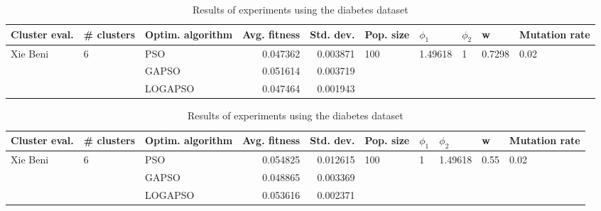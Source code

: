 \documentclass{article}
\begin{document}
\begin{table}
\centering
\caption{Results of experiments using the diabetes dataset}
\begin{tabular}{lllrrlllll}
\toprule
            Cluster eval. &        \# clusters & Optim. algorithm &  Avg. fitness &  Std. dev. &            Pop. size &               $\phi_{1}$ &         $\phi_{2}$ &                       w &         Mutation rate \\
\midrule
\multirow{3}{*}{Xie Beni} & \multirow{3}{*}{6} &              PSO &      0.047362 &   0.003871 & \multirow{3}{*}{100} & \multirow{3}{*}{1.49618} & \multirow{3}{*}{1} & \multirow{3}{*}{0.7298} & \multirow{3}{*}{0.02} \\
                          &                    &            GAPSO &      0.051614 &   0.003719 &                      &                          &                    &                         &                       \\
                          &                    &          LOGAPSO &      0.047464 &   0.001943 &                      &                          &                    &                         &                       \\
\bottomrule
\end{tabular}
\end{table}
\begin{table}
\centering
\caption{Results of experiments using the diabetes dataset}
\begin{tabular}{lllrrlllll}
\toprule
            Cluster eval. &        \# clusters & Optim. algorithm &  Avg. fitness &  Std. dev. &            Pop. size &         $\phi_{1}$ &               $\phi_{2}$ &                     w &         Mutation rate \\
\midrule
\multirow{3}{*}{Xie Beni} & \multirow{3}{*}{6} &              PSO &      0.054825 &   0.012615 & \multirow{3}{*}{100} & \multirow{3}{*}{1} & \multirow{3}{*}{1.49618} & \multirow{3}{*}{0.55} & \multirow{3}{*}{0.02} \\
                          &                    &            GAPSO &      0.048865 &   0.003369 &                      &                    &                          &                       &                       \\
                          &                    &          LOGAPSO &      0.053616 &   0.002371 &                      &                    &                          &                       &                       \\
\bottomrule
\end{tabular}
\end{table}
\end{document}
